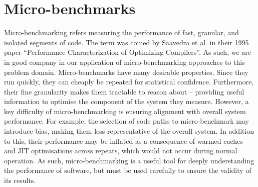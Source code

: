 













\section{Micro-benchmarks}
\label{sec:ubenchmark}

Micro-benchmarking refers measuring the performance of fast, granular, and isolated segments of code.
The term was coined by Saavedra et al. in their 1995 paper \cite{saavedraPerformanceCharacterizationOptimizing1995} ``Performance Characterization of Optimizing Compilers''. As such, we are in good company in our application of micro-benchmarking approaches to this problem domain.
Micro-benchmarks have many desirable properties. Since they run quickly, they can cheaply be repeated for statistical confidence.
Furthermore, their fine granularity makes them tractable to reason about -- providing useful information to optimise the component of the system they measure.
However, a key difficulty of micro-benchmarking is ensuring alignment with overall system performance. For example, the selection of code paths to micro-benchmark may introduce bias, making them less representative of the overall system. In addition to this, their performance may be inflated as a consequence of warmed caches and JIT optimisations across repeats, which would not occur during normal operation.
As such, micro-benchmarking is a useful tool for deeply understanding the performance of software, but must be used carefully to ensure the validity of its results.

